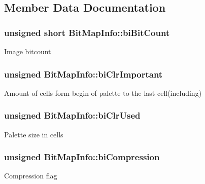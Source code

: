 \subsection{Member Data Documentation}
\subsubsection[{\texorpdfstring{bi\+Bit\+Count}{biBitCount}}]{\setlength{\rightskip}{0pt plus 5cm}unsigned short Bit\+Map\+Info\+::bi\+Bit\+Count}\hypertarget{structBitMapInfo_a3f4084cb6c90d147211a6f72cd130ffc}{}\label{structBitMapInfo_a3f4084cb6c90d147211a6f72cd130ffc}
Image bitcount 
\subsubsection[{\texorpdfstring{bi\+Clr\+Important}{biClrImportant}}]{\setlength{\rightskip}{0pt plus 5cm}unsigned Bit\+Map\+Info\+::bi\+Clr\+Important}\hypertarget{structBitMapInfo_a36418d0dbc8269b1b72ddbd794c9487f}{}\label{structBitMapInfo_a36418d0dbc8269b1b72ddbd794c9487f}
Amount of cells form begin of palette to the last cell(including) 
\subsubsection[{\texorpdfstring{bi\+Clr\+Used}{biClrUsed}}]{\setlength{\rightskip}{0pt plus 5cm}unsigned Bit\+Map\+Info\+::bi\+Clr\+Used}\hypertarget{structBitMapInfo_a720f71f528378c533bc3703206c09bcd}{}\label{structBitMapInfo_a720f71f528378c533bc3703206c09bcd}
Palette size in cells 
\subsubsection[{\texorpdfstring{bi\+Compression}{biCompression}}]{\setlength{\rightskip}{0pt plus 5cm}unsigned Bit\+Map\+Info\+::bi\+Compression}\hypertarget{structBitMapInfo_aa9ba5846e707d9f5a864d074a4c08f1e}{}\label{structBitMapInfo_aa9ba5846e707d9f5a864d074a4c08f1e}
Compression flag 

